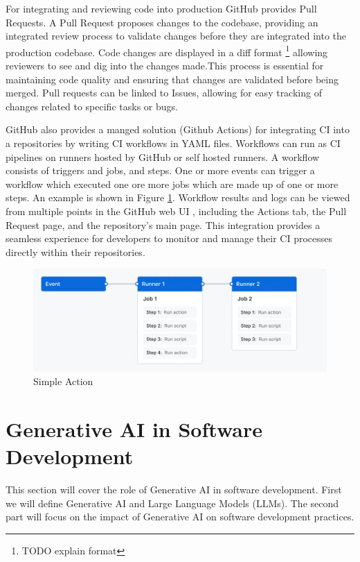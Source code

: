 For integrating and reviewing code into production GitHub provides Pull Requests. A Pull Request proposes changes to the codebase, providing an integrated review process to validate changes before they are integrated into the production codebase. Code changes are displayed in a diff format \footnote{TODO explain format} allowing reviewers to see and dig into the changes made.This process is essential for maintaining code quality and ensuring that changes are validated before being merged. %
Pull requests can be linked to Issues, allowing for easy tracking of changes related to specific tasks or bugs. %

GitHub also provides a manged solution (Github Actions) for integrating CI into a repositories by writing CI workflows in YAML files. Workflows can run as CI pipelines on runners hosted by GitHub or self hosted runners. A workflow consists of triggers and jobs, and steps. One or more events can trigger a workflow which executed one ore more jobs which are made up of one or more steps. \cite{Workflows} An example is shown in Figure \ref{fig:gh-workflow}. Workflow results and logs can be viewed from multiple points in the GitHub web UI , including the Actions tab, the Pull Request page, and the repository's main page. This integration provides a seamless experience for developers to monitor and manage their CI processes directly within their repositories.

\FloatBarrier
\begin{figure}[htbp]
    \centering
    \includegraphics[width=1\textwidth]{images/overview-actions-simple.png}
    \caption{Simple Action}
    \label{fig:gh-workflow}
\end{figure}
\FloatBarrier

\section{Generative AI in Software Development}
This section will cover the role of Generative AI in software development. First we will define Generative AI and Large Language Models (LLMs). The second part will focus on the impact of Generative AI on software development practices.
